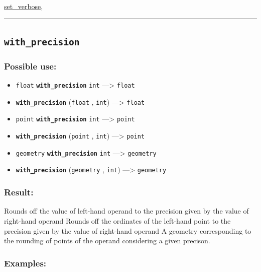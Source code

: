 \documentclass[]{book}
\providecommand{\tightlist}{%
  \setlength{\itemsep}{0pt}\setlength{\parskip}{0pt}}
\theoremstyle{definition}
\theoremstyle{definition}
\theoremstyle{definition}
\theoremstyle{remark}
\begin{document}
\href{operators-s-to-z.html\#set_verbose}{set\_verbose},

\begin{center}\rule{0.5\linewidth}{\linethickness}\end{center}

\subsection{\texorpdfstring{\texttt{with\_precision}}{with\_precision}}\label{with_precision}

\subsubsection{Possible use:}\label{possible-use-560}

\begin{itemize}
\tightlist
\item
  \texttt{float} \textbf{\texttt{with\_precision}} \texttt{int}
  ---\textgreater{} \texttt{float}
\item
  \textbf{\texttt{with\_precision}} (\texttt{float} , \texttt{int})
  ---\textgreater{} \texttt{float}
\item
  \texttt{point} \textbf{\texttt{with\_precision}} \texttt{int}
  ---\textgreater{} \texttt{point}
\item
  \textbf{\texttt{with\_precision}} (\texttt{point} , \texttt{int})
  ---\textgreater{} \texttt{point}
\item
  \texttt{geometry} \textbf{\texttt{with\_precision}} \texttt{int}
  ---\textgreater{} \texttt{geometry}
\item
  \textbf{\texttt{with\_precision}} (\texttt{geometry} , \texttt{int})
  ---\textgreater{} \texttt{geometry}
\end{itemize}

\subsubsection{Result:}\label{result-539}

Rounds off the value of left-hand operand to the precision given by the
value of right-hand operand Rounds off the ordinates of the left-hand
point to the precision given by the value of right-hand operand A
geometry corresponding to the rounding of points of the operand
considering a given precison.

\subsubsection{Examples:}\label{examples-387}
\end{document}
